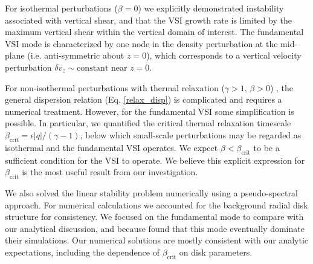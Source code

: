 For isothermal perturbations ($\beta=0$) we explicitly
demonstrated instability  associated with vertical shear, and that the 
VSI growth rate is limited by the maximum vertical shear within the 
vertical domain of interest. The fundamental VSI mode is characterized
by one node in the density perturbation at the mid-plane
(i.e. anti-symmetric about $z=0$), which corresponds to a vertical
velocity perturbation  $\delta v_z\sim\mathrm{constant}$ near
$z=0$. 


For non-isothermal  perturbations with thermal relaxation ($\gamma>1$,
$\beta>0$) , the general dispersion relation (Eq. \ref{relax_disp}) is
complicated and requires a numerical treatment. However, for the 
fundamental VSI some simplification is  possible. In particular, we
quantified the critical thermal relaxation timescale
$\beta_\mathrm{crit}=\epsilon|q|/(\gamma-1)$, below which small-scale
perturbations may be regarded as isothermal and the fundamental VSI
operates.  We expect $\beta<\beta_\mathrm{crit}$ to be a sufficient
condition for the VSI to operate. We believe this explicit expression for
$\beta_\mathrm{crit}$ is the most useful result from our
investigation.  

We also solved the linear stability problem numerically using a
pseudo-spectral approach. For numerical calculations we accounted for
the background radial disk structure for consistency. We focused
on the fundamental mode to compare with our analytical
discussion, and because \cite{nelson13} found that this mode 
eventually dominate their simulations. Our numerical solutions are
mostly consistent with our analytic expectations, including the 
dependence of $\beta_\mathrm{crit}$ on disk parameters. 


